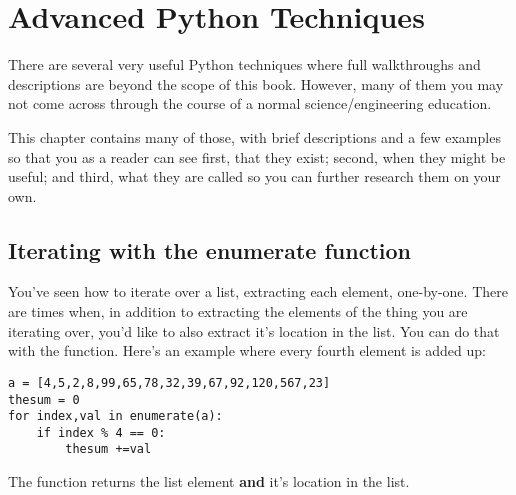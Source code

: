 \chapter{Advanced Python Techniques}
\label{chap:advpython}
There are several very useful Python techniques where full walkthroughs and descriptions are beyond the scope of this book.  However, many of them you may not come across through the course of a normal science/engineering education.

This chapter contains many of those, with brief descriptions and a few examples so that you as a reader can see first, that they exist; second, when they might be useful; and third, what they are called so you can further research them on your own.

\section{Iterating with the enumerate function}
You've seen how to iterate over a list, extracting each element,
one-by-one.  There are times when, in addition to extracting the
elements of the thing you are iterating over, you'd like to also
extract it's location in the list.  You can do that with the
 function.  Here's an example where every fourth
element is added up:
\begin{Verbatim}
a = [4,5,2,8,99,65,78,32,39,67,92,120,567,23]
thesum = 0
for index,val in enumerate(a):
    if index % 4 == 0:
        thesum +=val
\end{Verbatim}
The function  returns the list element \textbf{and}
it's location in the list.
